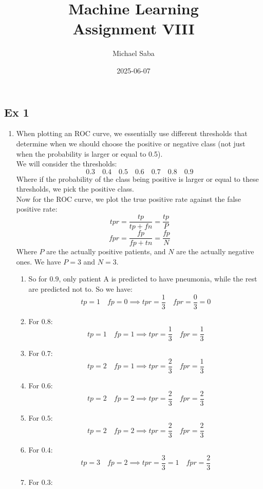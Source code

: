 \documentclass[12pt]{article}
\title{
    \Huge Machine Learning \\
    \Large Assignment VIII
}
\date{2025-06-07}
\author{Michael Saba}
\begin{document}
\maketitle
\newpage
\setlength{\parindent}{0pt}

\subsection*{Ex 1}

\begin{enumerate}[label = \letters]
\item
When plotting an ROC curve, we essentially
use different thresholds that determine when
we should choose the positive or negative class
(not just when the probability is larger or equal
to 0.5). \\
We will consider the thresholds:
\[ 0.3 \quad 0.4 \quad 0.5 \quad 0.6 \quad 0.7
\quad 0.8 \quad 0.9 \]
Where if the probability
of the class being positive is larger or equal to these
thresholds, we pick the positive class. \\
Now for the ROC curve, we plot the true positive
rate against the false positive rate:
\[ tpr = \dfrac{tp}{tp + fn} = \dfrac{tp}{P} \]
\[ fpr = \dfrac{fp}{fp + tn} = \dfrac{fp}{N} \]
Where $P$ are the actually positive patients,
and $N$ are the actually negative ones.
We have $P = 3$ and $N = 3$.
\begin{enumerate}[label = \numbers]
    \item 
    So for $0.9$, only patient A is predicted
    to have pneumonia, while the rest are predicted not to.
    So we have:
    \[ tp = 1 \quad fp = 0 \implies 
    tpr = \dfrac{1}{3} \quad 
    fpr = \dfrac{0}{3} = 0 \]
    \item For $0.8$:
    \[ tp = 1 \quad fp = 1 \implies 
    tpr = \dfrac{1}{3} \quad 
    fpr = \dfrac{1}{3} \]
    \item For $0.7$:
    \[ tp = 2 \quad fp = 1 \implies 
    tpr = \dfrac{2}{3} \quad 
    fpr = \dfrac{1}{3} \]
    \item For $0.6$:
    \[ tp = 2 \quad fp = 2 \implies 
    tpr = \dfrac{2}{3} \quad 
    fpr = \dfrac{2}{3} \]
    \item For $0.5$:
    \[ tp = 2 \quad fp = 2 \implies 
    tpr = \dfrac{2}{3} \quad 
    fpr = \dfrac{2}{3} \]
    \item For $0.4$:
    \[ tp = 3 \quad fp = 2 \implies 
    tpr = \dfrac{3}{3} = 1 \quad 
    fpr = \dfrac{2}{3} \]
    \item For $0.3$:

\end{enumerate}
\end{enumerate}
\end{document}
